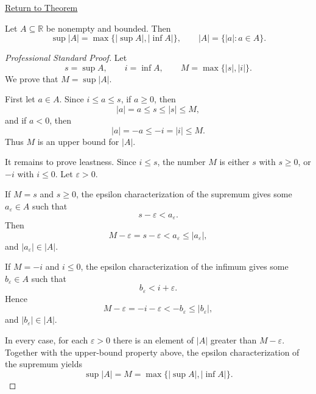 \newpage
{}
\label{prf:supremum-absolute-value-image}

\begin{remark*}[Return]
\hyperref[thm:supremum-absolute-value-image]{Return to Theorem}
\end{remark*}

\begin{theorem*}
Let $A\subseteq\mathbb{R}$ be nonempty and bounded. Then
\[
  \sup |A|=\max\{|\sup A|,|\inf A|\},
  \qquad
  |A|=\{|a|:a\in A\}.
\]
\end{theorem*}

\begin{proof}[Professional Standard Proof]
\LRAProofBodyStart
Let
\[
  s=\sup A,\qquad i=\inf A,\qquad
  M=\max\{|s|,|i|\}.
\]
We prove that $M=\sup |A|$.

First let $a\in A$. Since $i\le a\le s$, if $a\ge 0$, then
\[
  |a|=a\le s\le |s|\le M,
\]
and if $a<0$, then
\[
  |a|=-a\le -i=|i|\le M.
\]
Thus $M$ is an upper bound for $|A|$.

It remains to prove leastness. Since $i\le s$, the number $M$ is either $s$
with $s\ge 0$, or $-i$ with $i\le 0$. Let $\varepsilon>0$.

If $M=s$ and $s\ge 0$, the epsilon characterization of the supremum gives
some $a_\varepsilon\in A$ such that
\[
  s-\varepsilon<a_\varepsilon.
\]
Then
\[
  M-\varepsilon=s-\varepsilon<a_\varepsilon\le |a_\varepsilon|,
\]
and $|a_\varepsilon|\in |A|$.

If $M=-i$ and $i\le 0$, the epsilon characterization of the infimum gives
some $b_\varepsilon\in A$ such that
\[
  b_\varepsilon<i+\varepsilon.
\]
Hence
\[
  M-\varepsilon=-i-\varepsilon<-b_\varepsilon\le |b_\varepsilon|,
\]
and $|b_\varepsilon|\in |A|$.

In every case, for each $\varepsilon>0$ there is an element of $|A|$ greater
than $M-\varepsilon$. Together with the upper-bound property above, the epsilon
characterization of the supremum yields
\[
  \sup |A|=M=\max\{|\sup A|,|\inf A|\}.
\]
\end{proof}

